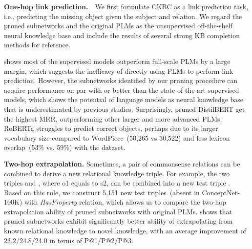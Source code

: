 %

\textbf{One-hop link prediction.}~~We first formulate CKBC as a link prediction task, 
i.e., predicting the missing object given the subject and relation. 
We regard the pruned subnetworks and the original PLMs as 
the unsupervised off-the-shelf neural knowledge base and include 
the results of several strong KB completion methods for reference.


 shows most of the supervised 
models outperform full-scale PLMs by a large margin, which suggests the 
inefficacy of directly using PLMs to perform link prediction. However, 
the subnetworks identified by our pruning procedure can
acquire performance on par with or better than the state-of-the-art 
supervised models, which shows the potential of language models as 
neural knowledge base that is underestimated by previous studies. 
Surprisingly, pruned DistilBERT get the 
highest MRR, outperforming other larger and more advanced PLMs. 
RoBERTa struggles to predict correct objects, perhaps due to 
its larger vocabulary size compared to WordPiece~(50,265 vs 30,522) 
and less lexicon overlap~(53\% vs. 59\%) with the dataset.



\textbf{Two-hop extrapolation.} Sometimes, a pair of commonsense relations can be combined to 
derive a new relational knowledge triple. For example, the two triples  and 
, where o1 equals to s2, can be combined into 
a new test triple . Based on this rule, 
we construct 5,151 new test triples~(absent in ConceptNet-100K) with 
\textit{HasProperty} relation, which allows us to compare the two-hop extrapolation ability 
of pruned subnetworks with original PLMs.  shows that pruned subnetworks 
exhibit significantly better ability of extrapolating from known relational knowledge to novel knowledge, 
with an average improvement of 23.2/24.8/24.0 in terms of P@1/P@2/P@3.

